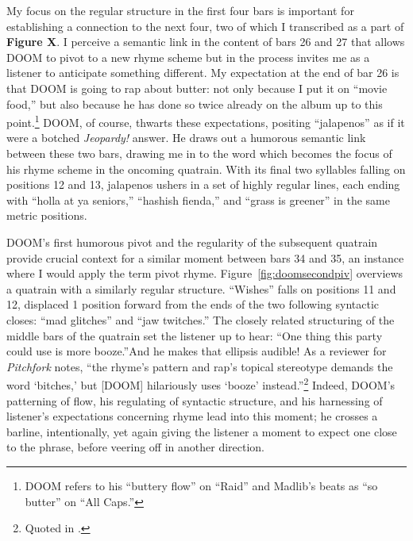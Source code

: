 My focus on the regular structure in the first four bars is important for establishing a connection
to the next four, two of which I transcribed as a part of \textbf{Figure X}. I perceive a semantic 
link in the content of bars 26 and 27 that allows DOOM to pivot to a new rhyme scheme but in the 
process invites me as a listener to anticipate something different. My expectation at the end of 
bar 26 is that DOOM is going to rap about butter: not only because I put it on ``movie food,'' but
also because he has done so twice already on the album up to this point.\footnote{
    DOOM refers to his ``buttery flow'' on ``Raid'' and Madlib's beats as ``so butter'' on ``All 
    Caps.''}
DOOM, of course, thwarts these expectations, positing ``jalapenos'' as if it were a botched 
\textit{Jeopardy!} answer. He draws out a humorous semantic link between these two bars, drawing
me in to the word which becomes the focus of his rhyme scheme in the oncoming quatrain. With its
final two syllables falling on positions 12 and 13, jalapenos ushers in a set of highly regular
lines, each ending with ``holla at ya seniors,'' ``hashish fienda,'' and ``grass is greener''
in the same metric positions.

DOOM's first humorous pivot and the regularity of the subsequent quatrain provide crucial context
for a similar moment between bars 34 and 35, an instance where I would apply the term pivot rhyme.
Figure~\ref{fig:doomsecondpiv} overviews a quatrain with a similarly regular structure. ``Wishes'' 
falls on positions 11 and 12, displaced 1 position forward from the ends of the two following 
syntactic  closes: ``mad glitches'' and ``jaw twitches.'' The closely related structuring of the 
middle bars of the quatrain set the listener up to hear: ``One thing this party could use is more\textellipsis
booze.''And he makes that ellipsis audible! As a reviewer for \textit{Pitchfork} notes, ``the rhyme's 
pattern and rap's topical stereotype demands the word `bitches,' but [DOOM] hilariously uses `booze'
instead.''\footnote{
    Quoted in \cite{estellecaswellRappingDeconstructedBest2016}.}
Indeed, DOOM's patterning of flow, his regulating of syntactic structure, and his harnessing of
listener's expectations concerning rhyme lead into this moment; he crosses a barline, intentionally,
yet again giving the listener a moment to expect one close to the phrase, before veering off in 
another direction.

